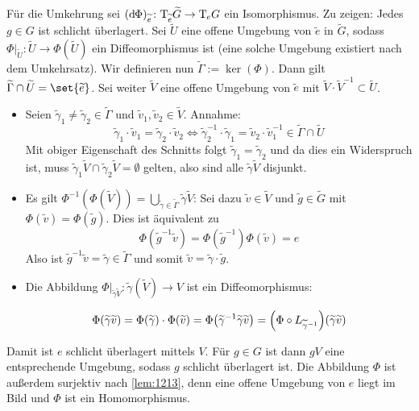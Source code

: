 \begin{beweis}
\begin{enumerate}[(1)]
        Für die Umkehrung sei $(\mathrm{d}\mkern-1.0mu \Phi)_{\widetilde{e}} \colon \mathrm{T}\mkern-0.85mu_{\widetilde{e}} \widetilde{G} \to \mathrm{T}\mkern-0.85mu_e G$ ein Isomorphismus.
        Zu zeigen: Jedes $g \in G$ ist schlicht überlagert.
        Sei $\widetilde{U}$ eine offene Umgebung von $\widetilde{e}$ in $\widetilde{G}$, sodass $\Phi|_{\widetilde{U}} \colon \widetilde{U} \to \Phi(\widetilde{U})$ ein Diffeomorphismus ist (eine solche Umgebung existiert nach dem Umkehrsatz).
        Wir definieren nun $\widetilde{\Gamma} := \ker (\Phi)$.
        Dann gilt $\widetilde{\Gamma} \cap \widetilde{U}= \set{\widetilde{e}}$.
        Sei weiter $\widetilde{V}$ eine offene Umgebung von $\widetilde{e}$ mit $\widetilde{V} \cdot \widetilde{V}^{-1} \subset \widetilde{U}$.
        \begin{itemize}
            \item  Seien $\widetilde{\gamma}_1 \neq \widetilde{\gamma}_2 \in \widetilde{\Gamma}$ und $\widetilde{v}_1, \widetilde{v}_2 \in \widetilde{V}$.
            Annahme:
            \[
                \widetilde{\gamma}_1 \cdot \widetilde{v}_1 = \widetilde{\gamma}_2 \cdot \widetilde{v}_2 \iff \widetilde{\gamma}_2^{-1} \cdot \widetilde{\gamma}_1 = \widetilde{v}_2 \cdot \widetilde{v}_1^{-1} \in \widetilde{\Gamma} \cap \widetilde{U}
            \]
            Mit obiger Eigenschaft des Schnitts folgt $\widetilde{\gamma}_1 = \widetilde{\gamma}_2$ und da dies ein Widerspruch ist, muss $\widetilde{\gamma}_1 \widetilde{V} \cap \widetilde{\gamma}_2 \widetilde{V} = \emptyset$ gelten, also sind alle $\widetilde{\gamma} \widetilde{V}$ disjunkt.
            \item Es gilt $\Phi^{-1}(\Phi(\widetilde{V})) = \bigcup_{\widetilde{\gamma} \in \widetilde{\Gamma}} \widetilde{\gamma}\widetilde{V}$:
            Sei dazu $\widetilde{v} \in  \widetilde{V}$ und $\widetilde{g} \in \widetilde{G}$ mit $\Phi(\widetilde{v}) = \Phi(\widetilde{g})$.
            Dies ist äquivalent zu
            \[
                \Phi(\widetilde{g}^{-1} \widetilde{v}) = \Phi(\widetilde{g}^{-1}) \Phi(\widetilde{v}) = e
            \]
            Also ist $\widetilde{g}^{-1} \widetilde{v} = \widetilde{\gamma} \in \widetilde{\Gamma}$ und somit $\widetilde{v} = \widetilde{\gamma} \cdot \widetilde{g}$.
            \item Die Abbildung $\Phi|_{\widetilde{\gamma} \widetilde{V}} \colon \widetilde{\gamma}(\widetilde{V}) \to V$ ist ein Diffeomorphismus:
            
            \[
                \Phi(\widetilde{\gamma} \widetilde{v}) = \Phi(\widetilde{\gamma}) \cdot \Phi(\widetilde{v}) = \Phi \enbrace*{\widetilde{\gamma}^{-1} \widetilde{\gamma} \widetilde{v}} = \enbrace*{\Phi \circ L_{\widetilde{\gamma}^{-1}}} (\widetilde{\gamma} \widetilde{v})
            \]
        \end{itemize}
		Damit ist $e$ schlicht überlagert mittels $V$.
		Für $g \in G$ ist dann $g V$ eine entsprechende Umgebung, sodass $g$ schlicht überlagert ist.
		Die Abbildung $\Phi$ ist außerdem surjektiv nach \autoref{lem:1213}, denn eine offene Umgebung von $e$ liegt im Bild und $\Phi$ ist ein Homomorphismus.\qedhere
    \end{enumerate}
\end{beweis}

